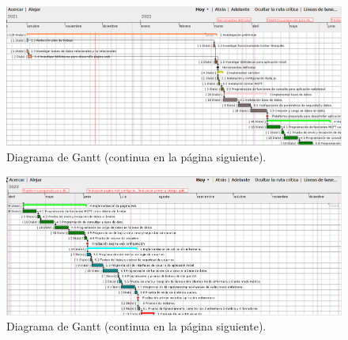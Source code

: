 \documentclass[
11pt, %
]{charter}
\begin{document}



\begin{landscape}
\begin{figure}[htpb]
\centering 
\includegraphics[height=.65\textheight]{./Figuras/planning1.png}
\caption{Diagrama de Gantt (continua en la página siguiente).}
\label{fig:diagGantt}
\end{figure}
\end{landscape}


\newpage
\begin{landscape}
\begin{figure}[htpb]
\centering 
\includegraphics[height=.65\textheight]{./Figuras/planning2.png}
\caption{Diagrama de Gantt (continua en la página siguiente).}
\label{fig:diagGantt2}
\end{figure}
\end{landscape}
\end{document}
